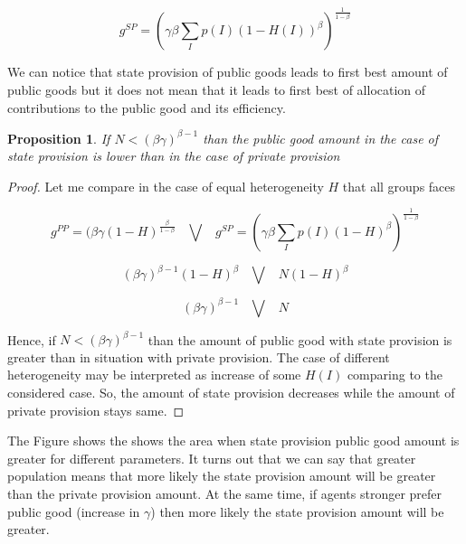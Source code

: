 \documentclass[letterpaper,11pt]{article}
\newtheorem{proposition}{Proposition}
\begin{document}
\[  g^{SP} = \left( \gamma  \beta\sum_{I} p(I) (1 - H(I))^\beta \right)^\frac{1}{1 - \beta}\]

We can notice that state provision of public goods leads to first best amount of public goods but it does not mean that it leads to first best of allocation of contributions to the public good and its efficiency.

\begin{proposition}
If $N < (\beta\gamma)^{\beta-1}$ than the public good amount in the case of state provision is lower than in the case of private provision
\end{proposition}

\begin{proof}
    Let me compare in the case of equal heterogeneity $H$ that all groups faces

    \[ g^{PP} =  (\beta\gamma  ( 1 - H)^\frac{\beta}{1 -\beta}\;\;\; \bigvee \;\;\; g^{SP} = \left( \gamma  \beta\sum_{I} p(I) (1 - H)^\beta \right)^\frac{1}{1 - \beta} \]

    \[  (\beta\gamma)^{\beta-1}  (1 - H)^\beta \;\;\; \bigvee \;\;\;  N (1 - H)^\beta \]

    \[  (\beta\gamma)^{\beta-1} \;\;\; \bigvee \;\;\;  N \]

    Hence, if $N < (\beta\gamma)^{\beta-1}$ than the amount of public good with state provision is greater than in situation with private provision. The case of different heterogeneity may be interpreted as increase of some $H(I)$ comparing to the considered case. So, the amount of state provision decreases while the amount of private provision stays same.
\end{proof}

The Figure shows the shows the area when state provision public good amount is greater for different parameters. It turns out that we can say that greater population means that more likely the state provision amount will be greater than the private provision amount. At the same time, if agents stronger prefer public good (increase in $\gamma$) then more likely the state provision amount will be greater.
\end{document}
